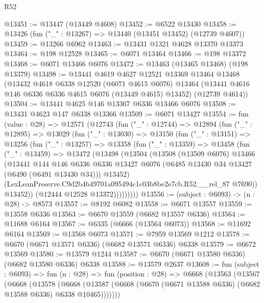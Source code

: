 \begin{lexlean}{R52}
\begin{coremodule}
@13451 := @13447 (@13449 @4608)
@13452 := @6522 @13430
@13458 := @13426 (fun ("_" : @13267) => @13440 (@13451 @13452) (@12739 @4607))
@13459 := @13266 @6962
@13463 := @13431 @1321 @4628 @13370 @13373
@13464 := @198 @12528
@13465 := @6071 @13464
@13466 := @198 @13372
@13468 := @6071 @13466 @6076
@13472 := @13463 (@13465 @13468) (@198 @13379)
@13498 := @13441
    @4619
    @4627
    @12521
    @13369
    @13464
    @13468
    (@13432
      @4618
      @6338
      @12520
      (@6071 @4615 @6076)
      @13464
      (@13441 @4616 @146 @6336 @6336 @4615 @6076 (@13449 @4615) @13452)
      (@12739 @4614))
@13504 := @13441 @4625 @146 @13367 @6336 @13466 @6076
@13508 := @13431 @4623 @147 @6338 @13366
@13509 := @6071 @13427
@13554 := fun (value : @28) =>
  @12571
    (@12743
      (fun ("_" : @12744) =>
      @12894
        (fun ("_" : @12895) =>
        @13029
          (fun ("_" : @13030) =>
          @13150
            (fun ("_" : @13151) =>
            @13256
              (fun ("_" : @13257) =>
              @13358
                (fun ("_" : @13359) =>
                @13458
                  (fun ("_" : @13459) =>
                  @13472
                    (@13498
                      (@13504
                        (@13508
                          (@13509 @6076)
                          @13466
                          (@13441
                            @144
                            @146
                            @6336
                            @6336
                            @13427
                            @6076
                            (@6485 @13430 @34 @13427 (@6490 (@6491 @13430 @34)))
                            @13452)
                          (LexLeanPreserve.C9d2b4b49701a095494c1c03b8be2e7cb.R52.__rel_87 @7690))
                        @13452))
                    (@12444 @12528 @13372)))))))))
@13556 := (subject : @6093) -> (n : @28) -> @8573
@13557 := @8192 @6082
@13558 := @6671 @13557
@13559 := @13558 @6336
@13563 := @6670 @13559 (@6682 @13557 @6336)
@13564 := @11688 @6164
@13567 := @6335 (@6666 (@13564 @6073))
@13568 := @11692 @6164
@13569 := @13568 @6073
@13571 := @7959 @13569 @1212
@13578 := @6670 (@6671 @13571 @6336) (@6682 @13571 @6336) @6338
@13579 := @6672 @13569
@13580 := @13579 @1244
@13587 := @6670 (@6671 @13580 @6336) (@6682 @13580 @6336) @6338
@13588 := @13579 @2637
@13608 := fun (subject : @6093) =>
  fun (n : @28) =>
  fun (position : @28) =>
  @6668
    (@13563
      (@13567
        (@6668
          (@13578
            (@6668
              (@13587 (@6668 (@6670 (@6671 @13588 @6336) (@6682 @13588 @6336) @6338 @10465)))))))

\end{coremodule}
\end{lexlean}
